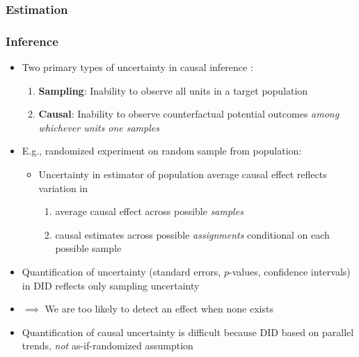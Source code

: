 \documentclass[table, xcolor = {dvipsnames}, 9pt]{beamer}
\theoremstyle{plain}
\begin{document}
\begin{frame}[t]
\frametitle{Estimation}
\vfill
{}
\vfill
\end{frame}
\begin{frame}[t]
\frametitle{Inference}
\vfill 
\begin{itemize}
\item Two primary types of uncertainty in causal inference \citep{abadieetal2020}: \vfill
\begin{enumerate}
\item \textbf{Sampling}: Inability to observe all units in a target population \vfill
\item \textbf{Causal}: Inability to observe counterfactual potential outcomes \textit{among whichever units one samples}  \vfill
\end{enumerate}
\item E.g., randomized experiment on random sample from population: \vfill
\begin{itemize}
\item Uncertainty in estimator of population average causal effect reflects variation in \vfill
\begin{enumerate}
\item average causal effect across possible \textit{samples} \vfill
\item causal estimates across possible \textit{assignments} conditional on each possible sample \vfill
\end{enumerate} 
\end{itemize}
\item Quantification of uncertainty (standard errors, $p$-values, confidence intervals) in DID reflects only sampling uncertainty \vfill
\item[] $\implies$ We are too likely to detect an effect when none exists \vfill
\item Quantification of causal uncertainty is difficult because DID based on parallel trends, \textit{not} as-if-randomized assumption \\ 
\citep{manskipepper2018} \vfill
\end{itemize}
\vfill
\end{frame}
\end{document}
